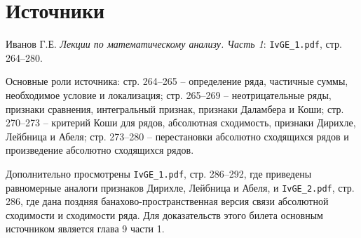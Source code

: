 \documentclass[12pt,a4paper]{article}
\begin{document}
\section*{Источники}

Иванов Г.Е. \emph{Лекции по математическому анализу. Часть 1}:
\texttt{IvGE\_1.pdf}, стр. 264--280.

Основные роли источника: стр. 264--265 -- определение ряда, частичные суммы,
необходимое условие и локализация; стр. 265--269 -- неотрицательные ряды,
признаки сравнения, интегральный признак, признаки Даламбера и Коши; стр.
270--273 -- критерий Коши для рядов, абсолютная сходимость, признаки
Дирихле, Лейбница и Абеля; стр. 273--280 -- перестановки абсолютно сходящихся
рядов и произведение абсолютно сходящихся рядов.

Дополнительно просмотрены \texttt{IvGE\_1.pdf}, стр. 286--292, где приведены
равномерные аналоги признаков Дирихле, Лейбница и Абеля, и
\texttt{IvGE\_2.pdf}, стр. 286, где дана поздняя банахово-пространственная
версия связи абсолютной сходимости и сходимости ряда. Для доказательств этого
билета основным источником является глава 9 части 1.
\end{document}
